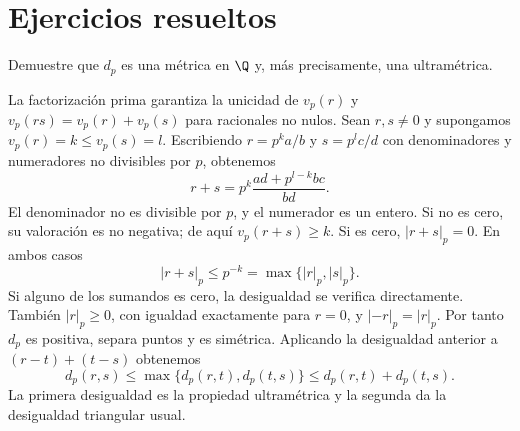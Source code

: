 \section{Ejercicios resueltos}
\begin{ejercicio}
Demuestre que $d_p$ es una métrica en $\Q$ y, más precisamente, una ultramétrica.
\end{ejercicio}
\begin{solucion}
La factorización prima garantiza la unicidad de $v_p(r)$ y $v_p(rs)=v_p(r)+v_p(s)$ para racionales no nulos. Sean $r,s\ne0$ y supongamos $v_p(r)=k\leq v_p(s)=l$. Escribiendo $r=p^ka/b$ y $s=p^lc/d$ con denominadores y numeradores no divisibles por $p$, obtenemos
\[
 r+s=p^k\frac{ad+p^{l-k}bc}{bd}.
\]
El denominador no es divisible por $p$, y el numerador es un entero. Si no es cero, su valoración es no negativa; de aquí $v_p(r+s)\geq k$. Si es cero, $|r+s|_p=0$. En ambos casos
\[
 |r+s|_p\leq p^{-k}=\max\{|r|_p,|s|_p\}.
\]
Si alguno de los sumandos es cero, la desigualdad se verifica directamente. También $|r|_p\geq0$, con igualdad exactamente para $r=0$, y $|-r|_p=|r|_p$. Por tanto $d_p$ es positiva, separa puntos y es simétrica. Aplicando la desigualdad anterior a $(r-t)+(t-s)$ obtenemos
\[
 d_p(r,s)\leq\max\{d_p(r,t),d_p(t,s)\}\leq d_p(r,t)+d_p(t,s).
\]
La primera desigualdad es la propiedad ultramétrica y la segunda da la desigualdad triangular usual.
\end{solucion}


